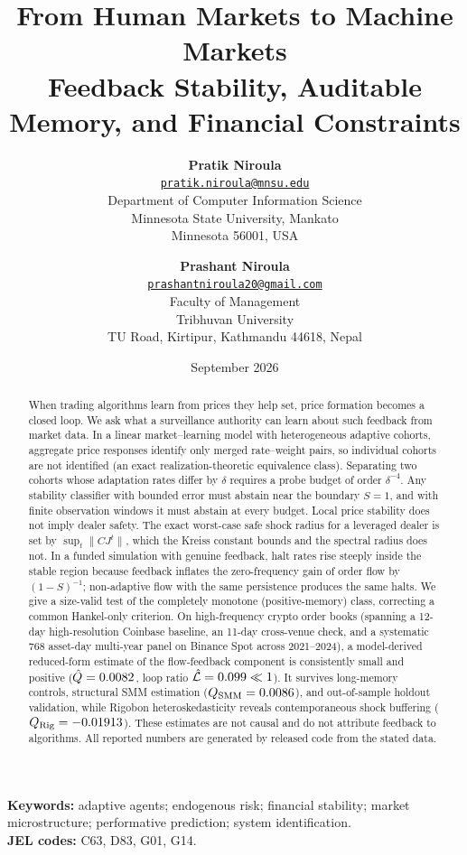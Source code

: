 \documentclass[10pt,twocolumn,letterpaper]{article}
\title{\textbf{From Human Markets to Machine Markets}\\[0.45em]
\large Feedback Stability, Auditable Memory, and Financial Constraints}
\author{\textbf{Pratik Niroula}\\[0.25em]
\small \href{mailto:pratik.niroula@mnsu.edu}{\texttt{pratik.niroula@mnsu.edu}}\\[0.25em]
\small Department of Computer Information Science\\
\small Minnesota State University, Mankato\\
\small Minnesota 56001, USA
\and
\textbf{Prashant Niroula}\\[0.25em]
\small \href{mailto:prashantniroula20@gmail.com}{\texttt{prashantniroula20@gmail.com}}\\[0.25em]
\small Faculty of Management\\
\small Tribhuvan University\\
\small TU Road, Kirtipur, Kathmandu 44618, Nepal}
\date{September 2026}
\theoremstyle{definition}
\theoremstyle{remark}
\begin{document}
\maketitle
\vspace{-1.4em}
\begin{abstract}
When trading algorithms learn from prices they help set, price formation becomes a closed loop. We ask what a surveillance authority can learn about such feedback from market data. In a linear market--learning model with heterogeneous adaptive cohorts, aggregate price responses identify only merged rate--weight pairs, so individual cohorts are not identified (an exact realization-theoretic equivalence class). Separating two cohorts whose adaptation rates differ by $\delta$ requires a probe budget of order $\delta^{-4}$. Any stability classifier with bounded error must abstain near the boundary $S=1$, and with finite observation windows it must abstain at every budget. Local price stability does not imply dealer safety. The exact worst-case safe shock radius for a leveraged dealer is set by $\sup_t\lVert CJ^t\rVert$, which the Kreiss constant bounds and the spectral radius does not. In a funded simulation with genuine feedback, halt rates rise steeply inside the stable region because feedback inflates the zero-frequency gain of order flow by $(1-S)^{-1}$; non-adaptive flow with the same persistence produces the same halts. We give a size-valid test of the completely monotone (positive-memory) class, correcting a common Hankel-only criterion. On high-frequency crypto order books (spanning a 12-day high-resolution Coinbase baseline, an 11-day cross-venue check, and a systematic 768 asset-day multi-year panel on Binance Spot across 2021--2024), a model-derived reduced-form estimate of the flow-feedback component is consistently small and positive ($\hat Q = 0.0082$, loop ratio $\hat{\mathcal L} = 0.099 \ll 1$). It survives long-memory controls, structural SMM estimation ($Q_{\text{SMM}} = 0.0086$), and out-of-sample holdout validation, while Rigobon heteroskedasticity reveals contemporaneous shock buffering ($Q_{\text{Rig}} = -0.01913$). These estimates are not causal and do not attribute feedback to algorithms. All reported numbers are generated by released code from the stated data.
\end{abstract}
\noindent\textbf{Keywords:} adaptive agents; endogenous risk; financial stability; market microstructure; performative prediction; system identification.\\
\textbf{JEL codes:} C63, D83, G01, G14.
\end{document}
